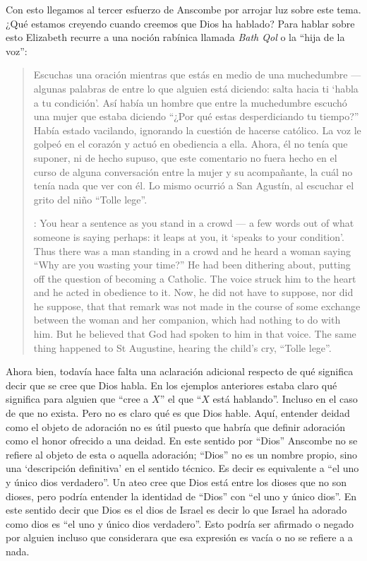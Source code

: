 Con esto llegamos al tercer esfuerzo de Anscombe por arrojar luz sobre este tema. ¿Qué estamos creyendo cuando creemos que Dios ha hablado? Para hablar sobre esto Elizabeth recurre a una noción rabínica llamada \emph{Bath Qol} o la \enquote{hija de la voz}: \blockquote[{\cite[118--119]{anscombe1981erp:faith}}: You hear a sentence as you stand in a crowd --- a few words out of what someone is saying perhaps: it leaps at you, it `speaks to your condition'. Thus there was a man standing in a crowd and he heard a woman saying ``Why are you wasting your time?'' He had been dithering about, putting off the question of becoming a Catholic. The voice struck him to the heart and he acted in obedience to it. Now, he did not have to suppose, nor did he suppose, that that remark was not made in the course of some exchange between the woman and her companion, which had nothing to do with him. But he believed that God had spoken to him in that voice. The same thing happened to St Augustine, hearing the child's cry, ``Tolle lege''.]{Escuchas una oración mientras que estás en medio de una muchedumbre --- algunas palabras de entre lo que alguien está diciendo: salta hacia ti `habla a tu condición'. Así había un hombre que entre la muchedumbre escuchó una mujer que estaba diciendo ``¿Por qué estas desperdiciando tu tiempo?'' Había estado vacilando, ignorando la cuestión de hacerse católico. La voz le golpeó en el corazón y actuó en obediencia a ella. Ahora, él no tenía que suponer, ni de hecho supuso, que este comentario no fuera hecho en el curso de alguna conversación entre la mujer y su acompañante, la cuál no tenía nada que ver con él. Lo mismo ocurrió a San Agustín, al escuchar el grito del niño ``Tolle lege''.}

Ahora bien, todavía hace falta una aclaración adicional respecto de qué significa decir que se cree que Dios habla. En los ejemplos anteriores estaba claro qué significa para alguien que \enquote{cree a $X$} el que \enquote{$X$ está hablando}. Incluso en el caso de que no exista. Pero no es claro qué es que Dios hable. Aquí, entender deidad como el objeto de adoración no es útil puesto que habría que definir adoración como el honor ofrecido a una deidad. En este sentido por \enquote{Dios} Anscombe no se refiere al objeto de esta o aquella adoración; \enquote{Dios} no es un nombre propio, sino una `descripción definitiva' en el sentido técnico. Es decir es equivalente a \enquote{el uno y único dios verdadero}. Un ateo cree que Dios está entre los dioses que no son dioses, pero podría entender la identidad de \enquote{Dios} con \enquote{el uno y único dios}. En este sentido decir que Dios es el dios de Israel es decir lo que Israel ha adorado como dios es \enquote{el uno y único dios verdadero}. Esto podría ser afirmado o negado por alguien incluso que considerara que esa expresión es vacía o no se refiere a a nada.

